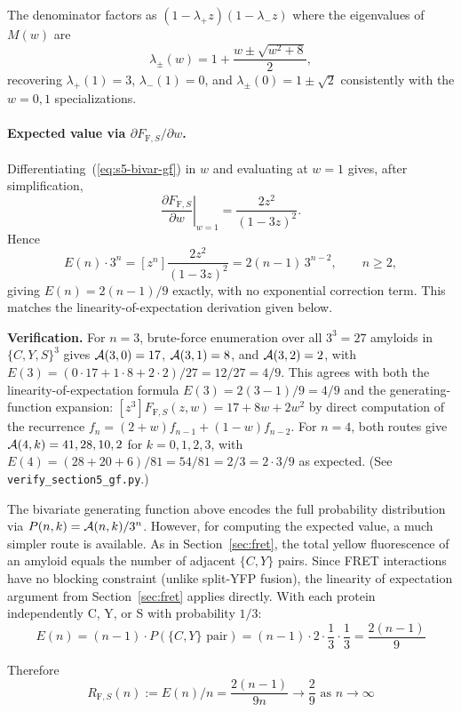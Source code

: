 \documentclass[11pt]{article}
\newcommand{\cA}{ {\cal A} }
\begin{document}
The denominator factors as $(1 - \lambda_+ z)(1 - \lambda_- z)$ where the eigenvalues of $M(w)$ are
\[
\lambda_\pm(w) = 1 + \frac{w \pm \sqrt{w^2 + 8}}{2},
\]
recovering $\lambda_+(1) = 3$, $\lambda_-(1) = 0$, and $\lambda_\pm(0) = 1 \pm \sqrt{2}$ consistently with the $w = 0, 1$ specializations.

\paragraph{Expected value via $\partial F_{\text{F},S}/\partial w$.} Differentiating~(\ref{eq:s5-bivar-gf}) in $w$ and evaluating at $w = 1$ gives, after simplification,
\[
\left.\frac{\partial F_{\text{F},S}}{\partial w}\right|_{w = 1} = \frac{2 z^2}{(1 - 3z)^2}.
\]
Hence
\[
E(n) \cdot 3^n = [z^n] \frac{2 z^2}{(1 - 3z)^2} = 2 (n - 1)\, 3^{n - 2}, \qquad n \ge 2,
\]
giving $E(n) = 2(n-1)/9$ exactly, with no exponential correction term. This matches the linearity-of-expectation derivation given below.

\textbf{Verification.} For $n = 3$, brute-force enumeration over all $3^3 = 27$ amyloids in $\{C,Y,S\}^3$ gives $\cA(3,0) = 17$, $\cA(3,1) = 8$, and $\cA(3,2) = 2$, with $E(3) = (0 \cdot 17 + 1 \cdot 8 + 2 \cdot 2)/27 = 12/27 = 4/9$. This agrees with both the linearity-of-expectation formula $E(3) = 2(3-1)/9 = 4/9$ and the generating-function expansion: $[z^3] F_{\text{F},S}(z, w) = 17 + 8w + 2w^2$ by direct computation of the recurrence $f_n = (2+w) f_{n-1} + (1-w) f_{n-2}$. For $n = 4$, both routes give $\cA(4, k) = 41, 28, 10, 2$ for $k = 0, 1, 2, 3$, with $E(4) = (28 + 20 + 6)/81 = 54/81 = 2/3 = 2 \cdot 3 / 9$ as expected. (See \texttt{verify\_section5\_gf.py}.)

The bivariate generating function above encodes the full probability distribution via $P(n,k)=\cA(n,k)/3^n$. However, for computing the expected value, a much simpler route is available. As in Section~\ref{sec:fret}, the total yellow fluorescence of an amyloid equals the number of adjacent $\{C,Y\}$ pairs. Since FRET interactions have no blocking constraint (unlike split-YFP fusion), the linearity of expectation argument from Section~\ref{sec:fret} applies directly. With each protein independently C, Y, or S with probability $1/3$:
\[
E(n) = (n-1) \cdot P(\{C,Y\} \text{ pair}) = (n-1) \cdot 2 \cdot \frac{1}{3} \cdot \frac{1}{3} = \frac{2(n-1)}{9}
\]

Therefore
\[
R_{\text{F},S}(n) := E(n)/n = \frac{2(n-1)}{9n} \longrightarrow \frac{2}{9} \text{ as } n \to \infty
\]
\end{document}
